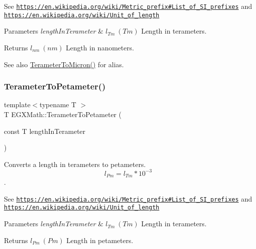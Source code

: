 See \href{https://en.wikipedia.org/wiki/Metric_prefix#List_of_SI_prefixes}{\tt https\+://en.\+wikipedia.\+org/wiki/\+Metric\+\_\+prefix\#\+List\+\_\+of\+\_\+\+S\+I\+\_\+prefixes} and \href{https://en.wikipedia.org/wiki/Unit_of_length}{\tt https\+://en.\+wikipedia.\+org/wiki/\+Unit\+\_\+of\+\_\+length} 
\begin{DoxyParams}{Parameters}
{\em length\+In\+Terameter} & $ l_{Tm}\ (Tm)$ Length in terameters. \\
\hline
\end{DoxyParams}
\begin{DoxyReturn}{Returns}
$ l_{nm}\ (nm)$ Length in nanometers. 
\end{DoxyReturn}
\begin{DoxySeeAlso}{See also}
\mbox{\hyperlink{group___e_g_x_math-_conversions-_length_conversions-_s_i-_terameter-_non-_s_i_gaa5fdc4aaf15e6428cf443e3d808403a3}{Terameter\+To\+Micron()}} for alias. 
\end{DoxySeeAlso}
\mbox{\label{group___e_g_x_math-_conversions-_length_conversions-_s_i-_terameter-_s_i_ga0e5474db8b07f9fd87fa6539a02af527}} 
\subsubsection{\texorpdfstring{Terameter\+To\+Petameter()}{TerameterToPetameter()}}
{\footnotesize\ttfamily template$<$typename T $>$ \\
T E\+G\+X\+Math\+::\+Terameter\+To\+Petameter (\begin{DoxyParamCaption}\item[{const T}]{length\+In\+Terameter }\end{DoxyParamCaption})}



Converts a length in terameters to petameters. \[ l_{Pm}=l_{Tm} * 10^{-3} \]. 

See \href{https://en.wikipedia.org/wiki/Metric_prefix#List_of_SI_prefixes}{\tt https\+://en.\+wikipedia.\+org/wiki/\+Metric\+\_\+prefix\#\+List\+\_\+of\+\_\+\+S\+I\+\_\+prefixes} and \href{https://en.wikipedia.org/wiki/Unit_of_length}{\tt https\+://en.\+wikipedia.\+org/wiki/\+Unit\+\_\+of\+\_\+length} 
\begin{DoxyParams}{Parameters}
{\em length\+In\+Terameter} & $ l_{Tm}\ (Tm)$ Length in terameters. \\
\hline
\end{DoxyParams}
\begin{DoxyReturn}{Returns}
$ l_{Pm}\ (Pm)$ Length in petameters. 
\end{DoxyReturn}
\mbox{\label{group___e_g_x_math-_conversions-_length_conversions-_s_i-_terameter-_s_i_ga131f3ccf4db05a31f5bd5c9487da9a4e}} 
